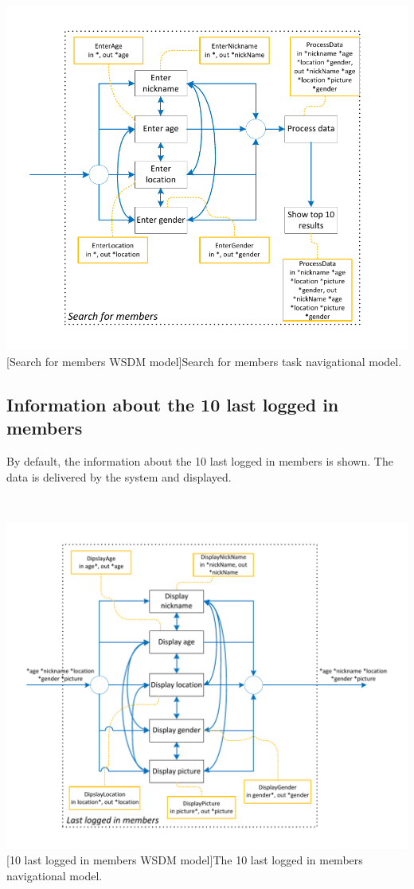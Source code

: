 \documentclass[11pt, a4paper,svglistings,oneside]{book}
\begin{document}
$\;$ \\
\noindent\begin{minipage}{\textwidth}
    \centering
   \includegraphics[scale=1]{Nav_SearchForMembers.pdf}
 [Search for members WSDM model]{Search for members task navigational model.}
\end{minipage}

\subsection{Information about the 10 last logged in members}

By default, the information about the 10 last logged in members is shown. The data is delivered by the system and displayed.

$\;$ \\
\noindent\begin{minipage}{\textwidth}
    \centering
   \includegraphics[scale=1]{Nav_LastLoggedInMembers.pdf}
 [10 last logged in members WSDM model]{The 10 last logged in members navigational model.}
\end{minipage}
\end{document}
